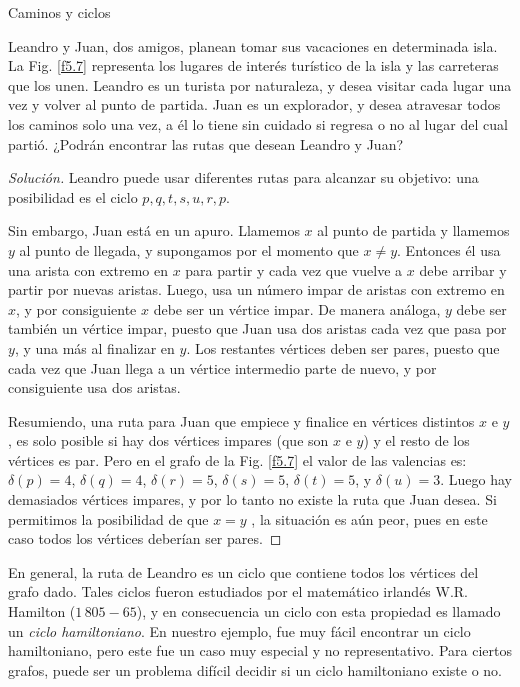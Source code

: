 \begin{section}{Caminos y ciclos}
\begin{ejemplo}\label{chunner} Leandro y Juan, dos amigos, planean tomar sus vacaciones en determinada isla. La Fig. \ref{f5.7} representa los lugares de interés turístico de la isla y las carreteras que los unen. Leandro es un turista por naturaleza, y desea visitar cada lugar una vez y volver al punto de partida. Juan es un explorador, y desea atravesar todos los caminos solo una vez, a él lo tiene sin cuidado si regresa o no al lugar del cual partió. ¿Podrán encontrar las rutas que desean Leandro y Juan?
\begin{proof}[Solución] Leandro puede usar diferentes rutas para alcanzar su objetivo: una posibilidad es el ciclo $p,q,t,s,u,r,p$.
    
    Sin embargo, Juan está en un apuro. Llamemos $x$ al punto de partida y llamemos $y$ al punto de llegada, y supongamos por el momento que $x \not= y$. Entonces él usa una arista con extremo en $x$ para partir y cada vez que vuelve a $x$ debe arribar y partir por nuevas aristas. Luego, usa un número impar de aristas con extremo en $x$, y por consiguiente $x$ debe ser un vértice impar. De manera análoga, $y$ debe ser también un vértice impar, puesto que Juan usa dos aristas cada vez que pasa por $y$, y una más al finalizar en $y$. Los restantes vértices deben ser pares, puesto que cada vez que Juan llega a un vértice intermedio parte de nuevo, y por consiguiente usa dos aristas.
    
    Resumiendo, una ruta para Juan que empiece y finalice en vértices distintos $x$ e $y$, es solo posible si hay dos vértices impares (que son $x$ e $y$) y el resto de los vértices es par.  Pero en el grafo de la Fig. \ref{f5.7} el valor de las valencias es: $\delta(p)=4$, $\delta(q)=4$, $\delta(r)=5$, $\delta(s)=5$, $\delta(t)=5$, y $\delta(u)=3$. Luego hay demasiados vértices impares, y por lo tanto no existe la ruta que Juan desea. Si permitimos la posibilidad de que $x=y$ , la situación es aún peor, pues en este caso todos los vértices deberían ser pares.
\end{proof}
\end{ejemplo}

En general, la ruta de Leandro es un ciclo que contiene todos los vértices del grafo dado. Tales ciclos fueron estudiados por el matemático irlandés W.R. Hamilton ($1\,805-65$),   y en consecuencia un ciclo con esta propiedad es llamado un \textit{ciclo hamiltoniano}. En nuestro ejemplo, fue muy fácil  encontrar un ciclo hamiltoniano, pero este fue un caso muy especial y no representativo. Para ciertos grafos, puede ser un problema difícil decidir si un ciclo hamiltoniano existe o no.


\end{section}
